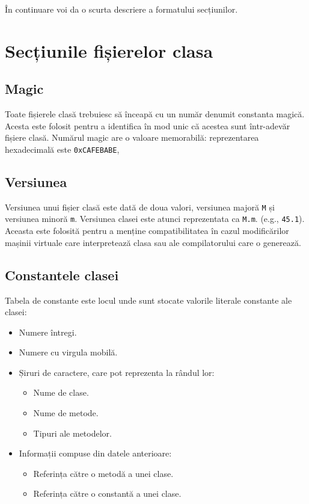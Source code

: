 În continuare voi da o scurta descriere a formatului secțiunilor.

\section{Secțiunile fișierelor clasa}

\subsection{Magic}

Toate fișierele clasă trebuiesc să înceapă cu un număr denumit constanta
magică. Acesta este folosit pentru a identifica în mod unic că acestea
sunt într-adevăr fișiere clasă. Numărul magic are o valoare memorabilă:
reprezentarea hexadecimală este \texttt{0xCAFEBABE},

\subsection{Versiunea}

Versiunea unui fișier clasă este dată de doua valori, versiunea majoră
\texttt{M} și versiunea minoră \texttt{m}. Versiunea clasei este atunci
reprezentata ca \texttt{M.m}. (e.g., \texttt{45.1}). Aceasta este
folosită pentru a menține compatibilitatea în cazul modificărilor
mașinii virtuale care interpretează clasa sau ale compilatorului care o
generează.

\subsection{Constantele clasei}

Tabela de constante este locul unde sunt stocate valorile literale
constante ale clasei:

\begin{itemize}
	\item Numere întregi.
	\item Numere cu virgula mobilă.
	\item Șiruri de caractere, care pot reprezenta la rândul lor:
	      \begin{itemize}
		      \item Nume de clase.
		      \item Nume de metode.
		      \item Tipuri ale metodelor.
	      \end{itemize}
	\item Informații compuse din datele anterioare:
	      \begin{itemize}
		      \item Referința către o metodă a unei clase.
		      \item Referința către o constantă a unei clase.
	      \end{itemize}
\end{itemize}

